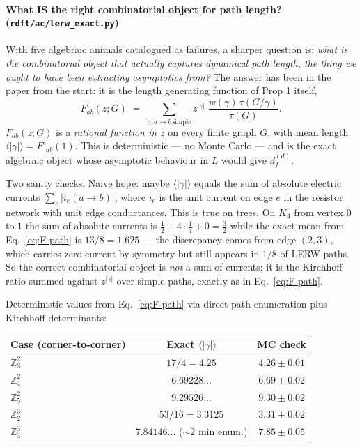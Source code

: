 \documentclass[10pt,a4paper,twocolumn]{article}
\theoremstyle{plain}
\theoremstyle{definition}
\newcommand{\Tree}{\tau}
\begin{document}
\paragraph{What IS the right combinatorial object for path
length? (\texttt{rdft/ac/lerw\_exact.py})}
With five algebraic animals catalogued as failures, a sharper
question is: \emph{what is the combinatorial object that actually
captures dynamical path length, the thing we ought to have been
extracting asymptotics from?}  The answer has been in the paper
from the start: it is the length generating function of Prop 1
itself,
\begin{equation}
  F_{ab}(z; G) \;=\; \sum_{\gamma : a \to b\,\text{simple}}
    z^{|\gamma|}\; \frac{w(\gamma)\, \Tree(G / \gamma)}{\Tree(G)}.
  \label{eq:F-path}
\end{equation}
$F_{ab}(z; G)$ is a \emph{rational function in $z$} on every finite
graph $G$, with mean length $\langle|\gamma|\rangle = F'_{ab}(1)$.
This is deterministic --- no Monte Carlo --- and is the exact
algebraic object whose asymptotic behaviour in $L$ would give
$d_f^{(d)}$.

Two sanity checks.  Naive hope: maybe $\langle|\gamma|\rangle$
equals the sum of absolute electric currents
$\sum_e |i_e(a \to b)|$, where $i_e$ is the unit current on edge
$e$ in the resistor network with unit edge conductances.  This is
true on trees.  On $K_4$ from vertex $0$ to $1$ the sum of
absolute currents is $\tfrac12 + 4 \cdot \tfrac14 + 0 = \tfrac32$
while the exact mean from Eq.~\eqref{eq:F-path} is $13/8 = 1.625$
--- the discrepancy comes from edge $(2, 3)$, which carries zero
current by symmetry but still appears in $1/8$ of LERW paths.
So the correct combinatorial object is \emph{not} a sum of currents;
it is the Kirchhoff ratio summed against $z^{|\gamma|}$ over simple
paths, exactly as in Eq.~\eqref{eq:F-path}.

Deterministic values from Eq.~\eqref{eq:F-path} via direct path
enumeration plus Kirchhoff determinants:
\begin{center}
{\small
\begin{tabular}{@{}lcc@{}}
\toprule
Case (corner-to-corner) & Exact $\langle|\gamma|\rangle$ & MC check \\
\midrule
$\mathbb{Z}^2_3$ & $17/4 = 4.25$          & $4.26 \pm 0.01$ \\
$\mathbb{Z}^2_4$ & $6.69228\ldots$         & $6.69 \pm 0.02$ \\
$\mathbb{Z}^2_5$ & $9.29526\ldots$         & $9.30 \pm 0.02$ \\
$\mathbb{Z}^3_2$ & $53/16 = 3.3125$        & $3.31 \pm 0.02$ \\
$\mathbb{Z}^3_3$ & $7.84146\ldots$ ($\sim 2$ min enum.)
                                           & $7.85 \pm 0.05$ \\
\bottomrule
\end{tabular}
}
\end{center}
\end{document}
